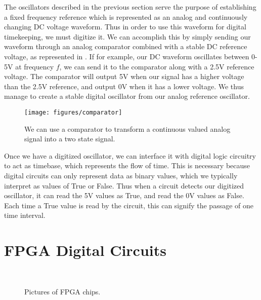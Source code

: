 The oscillators described in the previous section serve the purpose of establishing a fixed frequency reference which is represented as an analog and continuously changing DC voltage waveform.  Thus in order to use this waveform for digital timekeeping, we must digitize it.
We can accomplish this by simply sending our waveform through an analog
comparator combined with a stable DC reference voltage, as represented in
.   If for example, our DC waveform oscillates between 0-5V at frequency $f$, we can send it to the comparator along with a 2.5V reference voltage.  The comparator will output 5V when our signal has a higher voltage than the 2.5V reference, and output 0V when it has a lower voltage.   We thus manage to create a stable digital oscillator from our analog reference oscillator.

\begin{figure}[!ht] 
 \centering 
 \texttt{[image: figures/comparator]} 
 \caption[Electronic Comparator]{We can use a comparator to transform a
continuous valued analog signal into a two state signal.} 
 \label{fig:comparator} 
\end{figure}

   
Once we have a digitized oscillator, we can interface it with digital logic
circuitry to act as timebase, which represents the flow of time.  This is
necessary because digital circuits can only represent data as binary values,
which we typically interpret as values of True or False.  Thus when a circuit
detects our digitized oscillator, it can read the 5V values as True, and read
the 0V values as False.  Each time a True value is read by the circuit, this
can signify the passage of one time interval.


\section{FPGA Digital Circuits}


\begin{figure}[!ht]
  \centering
   \\
   \vspace{-10pt}
   \caption[FPGA Picture]{ Pictures of FPGA chips.}
  \label{fig:fpga_pics}
\end{figure}

